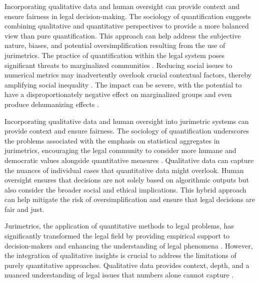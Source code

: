 Incorporating qualitative data and human oversight can provide context and ensure fairness in legal decision-making. The sociology of quantification suggests combining qualitative and quantitative perspectives to provide a more balanced view than pure quantification. This approach can help address the subjective nature, biases, and potential oversimplification resulting from the use of jurimetrics. The practice of quantification within the legal system poses significant threats to marginalized communities \cite{10.1057/s41599-020-00557-0,10.1057/s41599-020-0396-5}. Reducing social issues to numerical metrics may inadvertently overlook crucial contextual factors, thereby amplifying social inequality \cite{10.1057/s41599-020-00557-0,10.1057/s41599-020-0396-5}. The impact can be severe, with the potential to have a disproportionately negative effect on marginalized groups and even produce dehumanizing effects \cite{10.1057/s41599-020-0396-5,10.1057/s41599-020-00557-0}.

Incorporating qualitative data and human oversight into jurimetric systems can provide context and ensure fairness. The sociology of quantification underscores the problems associated with the emphasis on statistical aggregates in jurimetrics, encouraging the legal community to consider more humane and democratic values alongside quantitative measures \cite{10.1007/s11186-021-09453-1,10.5040/9781350220645}. Qualitative data can capture the nuances of individual cases that quantitative data might overlook. Human oversight ensures that decisions are not solely based on algorithmic outputs but also consider the broader social and ethical implications. This hybrid approach can help mitigate the risk of oversimplification and ensure that legal decisions are fair and just.

Jurimetrics, the application of quantitative methods to legal problems, has significantly transformed the legal field by providing empirical support to decision-makers and enhancing the understanding of legal phenomena \cite{10.3390/fi9040068,10.5040/9781350220645,de2010jurimetrics}. However, the integration of qualitative insights is crucial to address the limitations of purely quantitative approaches. Qualitative data provides context, depth, and a nuanced understanding of legal issues that numbers alone cannot capture \cite{10.1590/dados.2022.65.3.267,10.1057/s41599-020-0396-5}.

